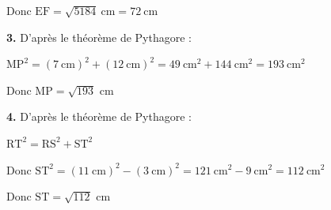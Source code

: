 \documentclass[12pt,a4paper,french]{article}
\begin{document}
Donc $\ensuremath{\mathrm{E}}\ensuremath{\mathrm{F}} = \sqrt{5184}~\text{cm} = 72~\text{cm}$

\medskip
\textbf{3.} D'après le théorème de Pythagore :

$\ensuremath{\mathrm{M}}\ensuremath{\mathrm{P}}^2 = (7~\text{cm})^2 + (12~\text{cm})^2 = 49~\text{cm}^2 + 144~\text{cm}^2 = 193~\text{cm}^2$

Donc $\ensuremath{\mathrm{M}}\ensuremath{\mathrm{P}} = \sqrt{193}$ cm

\medskip
\textbf{4.} D'après le théorème de Pythagore :

$\ensuremath{\mathrm{R}}\ensuremath{\mathrm{T}}^2 = \ensuremath{\mathrm{R}}\ensuremath{\mathrm{S}}^2 + \ensuremath{\mathrm{S}}\ensuremath{\mathrm{T}}^2$

Donc $\ensuremath{\mathrm{S}}\ensuremath{\mathrm{T}}^2 = (11~\text{cm})^2 - (3~\text{cm})^2 = 121~\text{cm}^2 - 9~\text{cm}^2 = 112~\text{cm}^2$

Donc $\ensuremath{\mathrm{S}}\ensuremath{\mathrm{T}} = \sqrt{112}$ cm

\medskip
\medskip
\end{document}
